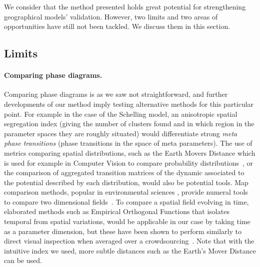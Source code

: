 \documentclass[Royal,sageh,times]{sagej}
\begin{document}
We consider that the method presented holds great potential for strengthening geographical models' validation. However, two limits and two areas of opportunities have still not been tackled. We discuss them in this section.

\subsection{Limits}

\paragraph{Comparing phase diagrams.} Comparing phase diagrams is as we saw not straightforward, and further developments of our method imply testing alternative methods for this particular point. For example in the case of the Schelling model, an anisotropic spatial segregation index (giving the number of clusters found and in which region in the parameter spaces they are roughly situated) would differentiate strong \emph{meta phase transitions} (phase transitions in the space of meta parameters). The use of metrics comparing spatial distributions, such as the Earth Movers Distance which is used for example in Computer Vision to compare probability distributions~\cite{rubner2000earth}, or the comparison of aggregated transition matrices of the dynamic associated to the potential described by each distribution, would also be potential tools. Map comparison methods, popular in environmental sciences , provide numeral tools to compare two dimensional fields~\cite{visser2006map}. To compare a spatial field evolving in time, elaborated methods such as Empirical Orthogonal Functions that isolates temporal from spatial variations, would be applicable in our case by taking time as a parameter dimension, but these have been shown to perform similarly to direct visual inspection when averaged over a crowdsourcing~\cite{10.1371/journal.pone.0178165}. Note that with the intuitive index we used, more subtle distances such as the Earth's Mover Distance can be used.
\end{document}
